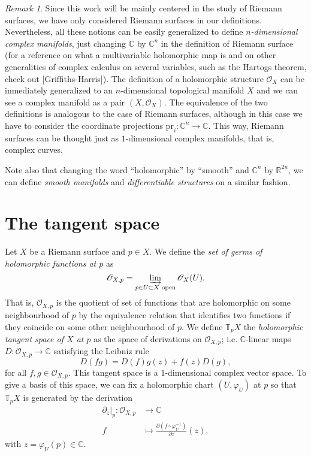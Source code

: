 \documentclass[12pt,a4paper]{book}
\theoremstyle{definition} \newtheorem{defn}[thm]{Definition}
\theoremstyle{definition} \newtheorem{ejemplo}[thm]{Example}
\theoremstyle{definition} \newtheorem{ejercicio}[thm]{Exercise}
\theoremstyle{remark} \newtheorem*{obs}{Remark}
\def\pr{\mathrm{pr}}
\def\CC{\mathbb{C}}
\def\RR{\mathbb{R}}
\def\TT{\mathbb{T}}
\def\OO{\mathscr{O}}
\begin{document}
\begin{obs}
  Since this work will be mainly centered in the study of Riemann surfaces, we have only considered Riemann surfaces in our definitions. Nevertheless, all these notions can be easily generalized to define \emph{$n$-dimensional complex manifolds}, just changing $\CC$ by $\CC^n$ in the definition of Riemann surface (for a reference on what a multivariable holomorphic map is and on other generalities of complex calculus on several variables, such as the Hartogs theorem, check out [Griffiths-Harris]). The definition of a holomorphic structure $\OO_X$ can be inmediately generalized to an $n$-dimensional topological manifold $X$ and we can see a complex manifold as a pair $(X,\OO_X)$. The equivalence of the two definitions is analogous to the case of Riemann surfaces, although in this case we have to consider the coordinate projections $\pr_i:\CC^n\rightarrow \CC$. This way, Riemann surfaces can be thought just as $1$-dimensional complex manifolds, that is, complex curves.

  Note also that changing the word ``holomorphic'' by ``smooth'' and $\CC^n$ by $\RR^{2n}$, we can define \emph{smooth manifolds} and \emph{differentiable structures} on a similar fashion.
\end{obs}

\section{The tangent space}
Let $X$ be a Riemann surface and $p\in X$. We define the \emph{set of germs of holomorphic functions at $p$} as
\begin{equation*}
  \OO_{X,p} = \varinjlim_{p\in U\subset X \text{ open}} \OO_X(U).
\end{equation*}
That is, $\OO_{X,p}$ is the quotient of set of functions that are holomorphic on some neighbourhood of $p$ by the equivalence relation that identifies two functions if they coincide on some other neighbourhood of $p$. We define $\TT_p X$ the \emph{holomorphic tangent space of $X$ at $p$} as the space of derivations on $\OO_{X,p}$; i.e. $\CC$-linear maps $D:\OO_{X,p} \rightarrow \CC$ satisfying the Leibniz rule
\begin{equation*}
  D(fg)=D(f)g(z) + f(z)D(g),
\end{equation*}
for all $f,g \in \OO_{X,p}$. This tangent space is a $1$-dimensional complex vector space. To give a basis of this space, we can fix a holomorphic chart $(U,\varphi_U)$ at $p$ so that $\TT_pX$ is generated by the derivation
\begin{align*}
  \partial_z|_p :\OO_{X,p}&\longrightarrow \CC\\ 
  f &\longmapsto \frac{\partial(f\circ \varphi_U^{-1})}{\partial z}(z), 
  \end{align*}
  with $z=\varphi_U(p)\in \CC$.
\end{document}
